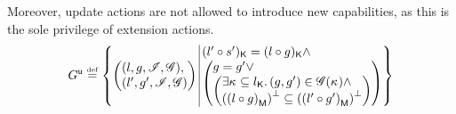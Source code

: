 Moreover, update actions are not allowed to introduce new
capabilities, as this is the sole privilege of extension actions.
\[
	\updateG \eqdef
 	\left\{
	\begin{array}{@{} l @{\hspace*{2pt}} | @{\hspace*{2pt}} r @{}}
	   	\left(
	   	\begin{array}{@{} l @{}}
	     	(l, g, \lmod, \gmod),\\
	     	(l', g', \lmod, \gmod)
	   	\end{array}
		\right)
	  	&
	  	\begin{array}{@{} l @{} }
	  		\capPart{(l' \composeL s')}  = \capPart{(l \composeL g)} \land\\
		  	\left(
		  	\begin{array}{@{} l @{} }
		 		g = g' \lor\\
		 	  	\left(
		 	  	\begin{array}{@{} l @{}}
		 	  		\exsts{\ca{} \subseteq \capPart{l}}
		 	  		(g, g') \in \gmod(\ca{}) \land\\
		 	  	
		 	  	\heapSize{\heapPart{\left(l \composeL g\right)}} \subseteq 
		 	  	\heapSize{\heapPart{\left(l' \composeL g'\right)}}
		 	  	\end{array}	
		 	  	\right)
		 	\end{array}
	   		\right)
   		\end{array}
 	\end{array}
	\right\}
\]
